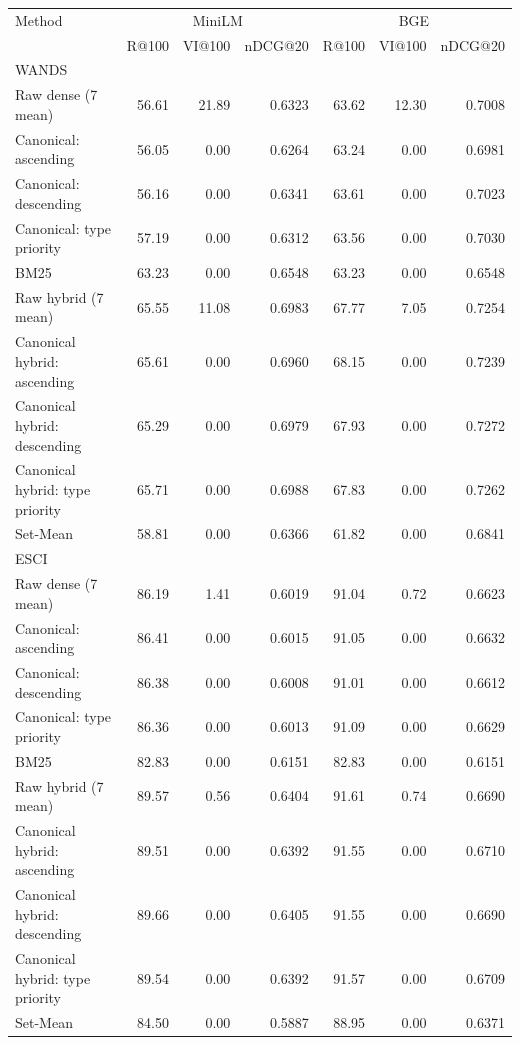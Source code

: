 \begin{tabular}{lrrrrrr}
\toprule
Method & \multicolumn{3}{c}{MiniLM} & \multicolumn{3}{c}{BGE} \\
 & R@100 & VI@100 & nDCG@20 & R@100 & VI@100 & nDCG@20 \\
\midrule
\multicolumn{7}{l}{WANDS} \\
Raw dense (7 mean) & 56.61 & 21.89 & 0.6323 & 63.62 & 12.30 & 0.7008 \\
Canonical: ascending & 56.05 & 0.00 & 0.6264 & 63.24 & 0.00 & 0.6981 \\
Canonical: descending & 56.16 & 0.00 & 0.6341 & 63.61 & 0.00 & 0.7023 \\
Canonical: type priority & 57.19 & 0.00 & 0.6312 & 63.56 & 0.00 & 0.7030 \\
BM25 & 63.23 & 0.00 & 0.6548 & 63.23 & 0.00 & 0.6548 \\
Raw hybrid (7 mean) & 65.55 & 11.08 & 0.6983 & 67.77 & 7.05 & 0.7254 \\
Canonical hybrid: ascending & 65.61 & 0.00 & 0.6960 & 68.15 & 0.00 & 0.7239 \\
Canonical hybrid: descending & 65.29 & 0.00 & 0.6979 & 67.93 & 0.00 & 0.7272 \\
Canonical hybrid: type priority & 65.71 & 0.00 & 0.6988 & 67.83 & 0.00 & 0.7262 \\
Set-Mean & 58.81 & 0.00 & 0.6366 & 61.82 & 0.00 & 0.6841 \\
\midrule
\multicolumn{7}{l}{ESCI} \\
Raw dense (7 mean) & 86.19 & 1.41 & 0.6019 & 91.04 & 0.72 & 0.6623 \\
Canonical: ascending & 86.41 & 0.00 & 0.6015 & 91.05 & 0.00 & 0.6632 \\
Canonical: descending & 86.38 & 0.00 & 0.6008 & 91.01 & 0.00 & 0.6612 \\
Canonical: type priority & 86.36 & 0.00 & 0.6013 & 91.09 & 0.00 & 0.6629 \\
BM25 & 82.83 & 0.00 & 0.6151 & 82.83 & 0.00 & 0.6151 \\
Raw hybrid (7 mean) & 89.57 & 0.56 & 0.6404 & 91.61 & 0.74 & 0.6690 \\
Canonical hybrid: ascending & 89.51 & 0.00 & 0.6392 & 91.55 & 0.00 & 0.6710 \\
Canonical hybrid: descending & 89.66 & 0.00 & 0.6405 & 91.55 & 0.00 & 0.6690 \\
Canonical hybrid: type priority & 89.54 & 0.00 & 0.6392 & 91.57 & 0.00 & 0.6709 \\
Set-Mean & 84.50 & 0.00 & 0.5887 & 88.95 & 0.00 & 0.6371 \\
\bottomrule
\end{tabular}
